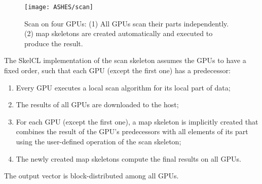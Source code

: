 \begin{figure*}[tbp]
    \centering
    \texttt{[image: ASHES/scan]}
    \caption{Scan on four GPUs: (1) All GPUs scan their parts independently.
            (2) map skeletons are created automatically and
             executed to produce the result.}
    \label{fig:scan}
\end{figure*}

The SkelCL implementation of the scan skeleton assumes the GPUs to have a fixed order, such that each GPU (except the first one) has a predecessor:
\begin{enumerate}
 \item Every GPU executes a local scan algorithm for its local part of data;
 \item The results of all GPUs are downloaded to the host;
 \item For each GPU (except the first one), a map skeleton is implicitly created that combines the result of the GPU's predecessors with all elements of its part using the user-defined operation of the scan skeleton;
 \item The newly created map skeletons compute the final results on all GPUs.
\end{enumerate}
The output vector is block-distributed among all GPUs.
